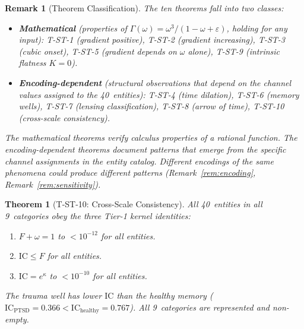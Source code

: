\documentclass[
  aps,
  prd,
  twocolumn,
  superscriptaddress,
  nofootinbib,
  floatfix
]{revtex4-2}
\newtheorem{theorem}{Theorem}
\newtheorem{remark}{Remark}
\newcommand{\Gam}{\Gamma}
\newcommand{\eps}{\varepsilon}
\newcommand{\IC}{\mathrm{IC}}
\begin{document}
\begin{remark}[Theorem Classification]
\label{rem:theorem_classes}
The ten theorems fall into two classes:
\begin{itemize}
\item \textbf{Mathematical} (properties of $\Gam(\omega) =
  \omega^3/(1 - \omega + \eps)$, holding for any input):
  T-ST-1 (gradient positive), T-ST-2 (gradient increasing),
  T-ST-3 (cubic onset), T-ST-5 (gradient depends on $\omega$
  alone), T-ST-9 (intrinsic flatness $K = 0$).
\item \textbf{Encoding-dependent} (structural observations
  that depend on the channel values assigned to the
  40~entities): T-ST-4 (time dilation), T-ST-6 (memory wells),
  T-ST-7 (lensing classification), T-ST-8 (arrow of time),
  T-ST-10 (cross-scale consistency).
\end{itemize}
The mathematical theorems verify calculus properties of a
rational function.  The encoding-dependent theorems document
patterns that emerge from the specific channel assignments
in the entity catalog.  Different encodings of the same
phenomena could produce different patterns
(Remark~\ref{rem:encoding}, Remark~\ref{rem:sensitivity}).
\end{remark}

\begin{theorem}[T-ST-10: Cross-Scale Consistency]
\label{thm:T10}
All 40~entities in all 9~categories obey the three Tier-1
kernel identities:
\begin{enumerate}
\item $F + \omega = 1$ to $< 10^{-12}$ for all entities.
\item $\IC \leq F$ for all entities.
\item $\IC = e^{\kappa}$ to $< 10^{-10}$ for all entities.
\end{enumerate}
The trauma well has lower $\IC$ than the healthy memory
($\IC_{\text{PTSD}} = 0.366 < \IC_{\text{healthy}} = 0.767$).
All 9~categories are represented and non-empty.
\end{theorem}
\end{document}
